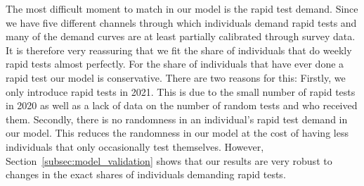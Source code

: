 The most difficult moment to match in our model is the rapid test demand. Since we have
five different channels through which individuals demand rapid tests and many of the
demand curves are at least partially calibrated through survey data. It is therefore very
reassuring that we fit the share of individuals that do weekly rapid tests almost
perfectly. For the share of individuals that have ever done a rapid test our model is
conservative. There are two reasons for this: Firstly, we only introduce rapid tests in
2021. This is due to the small number of rapid tests in 2020 as well as a lack of data on
the number of random tests and who received them. Secondly, there is no randomness in an
individual's rapid test demand in our model. This reduces the randomness in our model at
the cost of having less individuals that only occasionally test themselves.
However, Section~\ref{subsec:model_validation} shows that our results are very robust to
changes in the exact shares of individuals demanding rapid tests.

